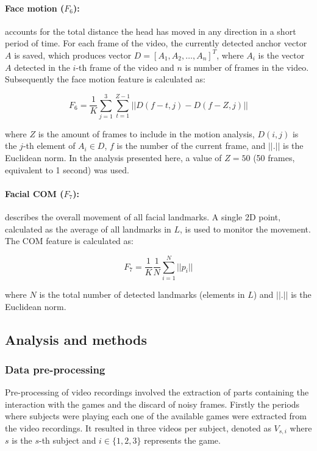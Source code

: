 \paragraph{Face motion ($F_6$):} accounts for the total distance the head has moved in any direction in a short period of time. For each frame of the video, the currently detected anchor vector $A$ is saved, which produces vector $D = [A_1, A_2, \dots, A_n]^T$, where $A_i$ is the vector $A$ detected in the $i$-th frame of the video and $n$ is number of frames in the video. Subsequently the face motion feature is calculated as:

\[
F_6 = \frac{1}{K} \sum_{j=1}^{3} \sum_{t=1}^{Z - 1} || D(f - t, j) - D(f - Z, j) ||
\]

where $Z$ is the amount of frames to include in the motion analysis, $D(i,j)$ is the $j$-th element of $A_i \in D$, $f$ is the number of the current frame, and $||.||$ is the Euclidean norm. In the analysis presented here, a value of $Z=50$ (50 frames, equivalent to 1 second) was used.

\paragraph{Facial COM ($F_7$):} describes the overall movement of all facial landmarks. A single 2D point, calculated as the average of all landmarks in $L$, is used to monitor the movement. The COM feature is calculated as:

\[
F_7 = \frac{1}{K} \frac{1}{N} \sum_{i=1}^{N} || p_i ||
\]

where $N$ is the total number of detected landmarks (elements in $L$) and $||.||$ is the Euclidean norm.

\subsection{Analysis and methods}
\label{sec:experiment1-study4-feature-analysis}

\subsubsection{Data pre-processing}

Pre-processing of video recordings involved the extraction of parts containing the interaction with the games and the discard of noisy frames. Firstly the periods where subjects were playing each one of the available games were extracted from the video recordings. It resulted in three videos per subject, denoted as $V_{s,i}$ where $s$ is the $s$-th subject and $i \in \{1, 2, 3\}$ represents the game.

